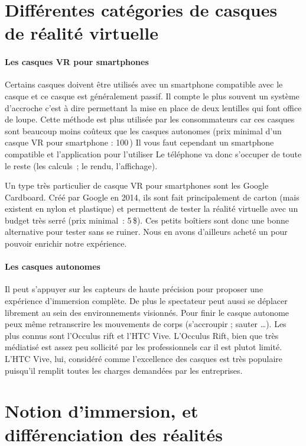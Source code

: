 \documentclass[12pt, a4paper]{report}
\newcommand{\euro}{\,\EUR}
\begin{document}
\section[Catégories de casque]{Différentes catégories de casques de réalité virtuelle}

\paragraph{Les casques VR pour smartphones}

Certains casques doivent être utilisés avec un smartphone compatible avec le casque et ce casque est généralement passif. Il compte le plus souvent un système d’accroche c’est à dire permettant la mise en place de deux lentilles qui font office de loupe. Cette méthode est plus utilisée par les consommateurs car ces casques sont beaucoup moins coûteux que les casques autonomes (prix minimal d’un casque VR pour smartphone : 100\euro{}) Il vous faut cependant un smartphone compatible et l’application pour l’utiliser  Le téléphone va donc s’occuper de toute le reste (les calculs ; le rendu, l’affichage).

Un type très particulier de casque VR pour smartphones sont les Google Cardboard. Créé par Google en 2014, ils sont fait principalement de carton (mais existent en nylon et plastique) et permettent de tester la réalité virtuelle avec un budget très serré (prix minimal : 5\,\$). Ces petits boîtiers sont donc une bonne alternative pour tester sans se ruiner. Nous en avons d’ailleurs acheté un pour pouvoir enrichir notre expérience.

\paragraph{Les casques autonomes} Il peut s'appuyer sur les capteurs de haute précision pour proposer une expérience d'immersion complète. De plus le spectateur peut aussi se déplacer librement au sein des environnements visionnés. Pour finir le casque autonome peux même retranscrire les mouvements de corps (s'accroupir ; sauter \ldots{}). Les plus connus sont l'Occulus rift et l'HTC Vive. L'Occulus Rift, bien que très médiatisé est assez peu sollicité par les professionnels car il est plutot limité. L'HTC Vive, lui, considéré comme l'excellence des casques est très populaire puisqu'il remplit toutes les charges demandées par les entreprises.

\section[Catégories de réalités]{Notion d'immersion, et différenciation des réalités}
\end{document}
